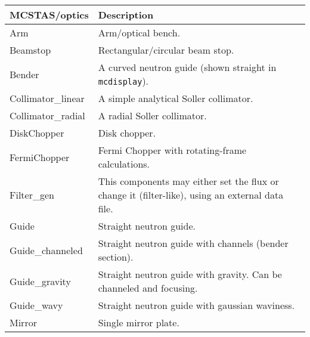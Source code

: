 \begin{table}
  \begin{center}
    {\let\my=\\
    \begin{tabular}{|p{}|p{}|}
      \hline
       {\bf MCSTAS/optics} & Description \\
       \hline
 Arm                &  Arm/optical bench. \\
 Beamstop          &   Rectangular/circular beam stop. \\
 Bender            &  A curved neutron guide (shown straight in \verb+mcdisplay+). \\
 Collimator\_linear &  A simple analytical Soller collimator. \\
 Collimator\_radial &  A radial Soller collimator.\\
 DiskChopper           &   Disk chopper. \\
 FermiChopper      &  Fermi Chopper with rotating-frame calculations. \\
 Filter\_gen        &   This components may either set the flux
                      or change it (filter-like), using
                      an external data file. \\
 Guide             &   Straight neutron guide. \\
 Guide\_channeled   &   Straight neutron guide with
                      channels (bender section). \\
 Guide\_gravity     &  Straight neutron guide with gravity. Can be
                      channeled and focusing. \\
 Guide\_wavy        &  Straight neutron guide with gaussian waviness. \\
 Mirror             &  Single mirror plate. \\


\end{tabular}}
\end{center}
\end{table}
